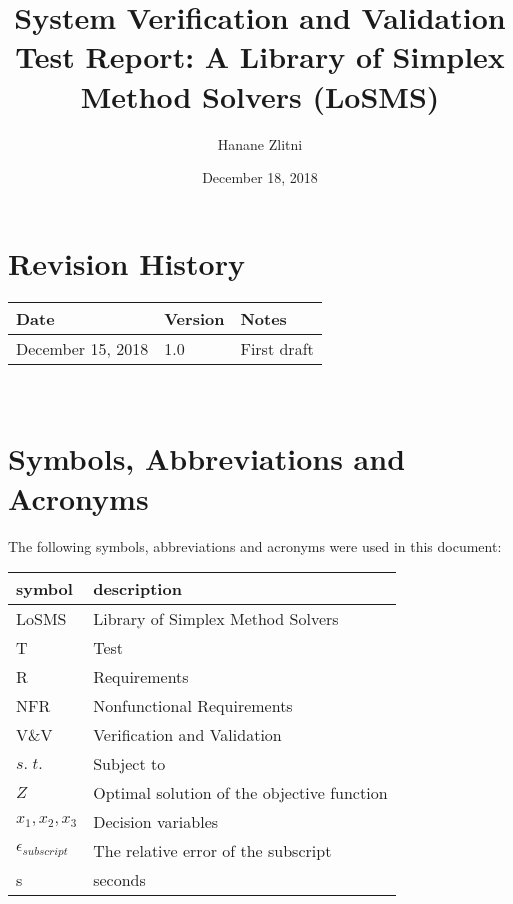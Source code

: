 \documentclass[12pt, titlepage]{article}
\newcommand{\progname}{Library of Simplex Method Solvers}
\newcommand{\famname}{LoSMS}
\begin{document}
\title{System Verification and Validation Test Report: A \progname{} 
(\famname{})} 
\author{Hanane Zlitni}
\date{December 18, 2018}
	
\maketitle


\section{Revision History}

\begin{tabularx}{\textwidth}{p{3cm}p{2cm}X}
\toprule {\bf Date} & {\bf Version} & {\bf Notes}\\
\midrule
December 15, 2018 & 1.0 & First draft\\
\bottomrule
\end{tabularx}

~\newpage

\section{Symbols, Abbreviations and Acronyms}

The following symbols, abbreviations and acronyms were used in this document: \\

\renewcommand{\arraystretch}{1.2}
\begin{tabular}{l l} 
  \toprule		
  \textbf{symbol} & \textbf{description}\\
  \midrule 
  \famname{} & Library of Simplex Method Solvers\\
  T & Test\\
  R & Requirements\\
  NFR & Nonfunctional Requirements\\
  V\&V & Verification and Validation\\
  $s.\;t.$ & Subject to\\
  $Z$ & Optimal solution of the objective function\\
  $x_1, x_2, x_3$ & Decision variables\\
  $\epsilon_{subscript}$ & The relative error of the subscript\\
  s & seconds\\
  \bottomrule
\end{tabular}\\
\end{document}
